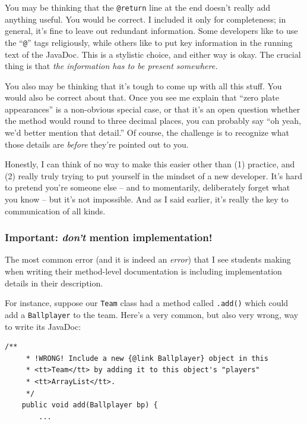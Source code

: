 You may be thinking that the \texttt{@return} line at the end doesn't really
add anything useful. You would be correct. I included it only for
completeness; in general, it's fine to leave out redundant information. Some
developers like to use the ``\texttt{@}'' tags religiously, while others like
to put key information in the running text of the JavaDoc. This is a stylistic
choice, and either way is okay. The crucial thing is that \textit{the
information has to be present somewhere.}

You also may be thinking that it's tough to come up with all this stuff. You
would also be correct about that. Once you see me explain that ``zero plate
appearances'' is a non-obvious special case, or that it's an open question
whether the method would round to three decimal places, you can probably say
``oh yeah, we'd better mention that detail.'' Of course, the challenge is to
recognize what those details are \textit{before} they're pointed out to you.

Honestly, I can think of no way to make this easier other than (1) practice,
and (2) really truly trying to put yourself in the mindset of a new developer.
It's hard to pretend you're someone else -- and to momentarily, deliberately
forget what you know -- but it's not impossible. And as I said earlier, it's
really the key to communication of all kinds.

\subsubsection{Important: \textit{don't} mention implementation!}

The most common error (and it is indeed an \textit{error}) that I see students
making when writing their method-level documentation is including
implementation details in their description.

For instance, suppose our \texttt{Team} class had a method called
\texttt{.add()} which could add a \texttt{Ballplayer} to the team. Here's a
very common, but also very wrong, way to write its JavaDoc:

\vspace{-.15in}
\begin{Verbatim}[fontsize=\scriptsize,samepage=true,frame=single]
    /**
     * !WRONG! Include a new {@link Ballplayer} object in this
     * <tt>Team</tt> by adding it to this object's "players"
     * <tt>ArrayList</tt>.
     */
    public void add(Ballplayer bp) {
        ...
\end{Verbatim}

